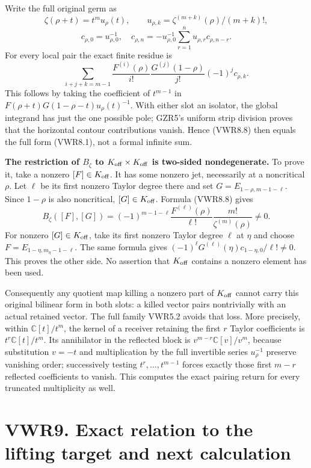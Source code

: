 Write the full original germ as \[
\zeta(\rho+t)=t^mu_\rho(t),\qquad
u_{\rho,k}=\zeta^{(m+k)}(\rho)/(m+k)!,
\] \[
c_{\rho,0}=u_{\rho,0}^{-1},\quad
c_{\rho,n}=-u_{\rho,0}^{-1}\sum_{r=1}^nu_{\rho,r}c_{\rho,n-r}.
\tag{VWR8.7}
\] For every local pair the exact finite residue is \[
\sum_{i+j+k=m-1}\frac{F^{(i)}(\rho)}{i!}
 \frac{G^{(j)}(1-\rho)}{j!}(-1)^jc_{\rho,k}.
\tag{VWR8.8}
\] This follows by taking the coefficient of \(t^{m-1}\) in
\(F(\rho+t)G(1-\rho-t)u_\rho(t)^{-1}\). With either slot an isolator,
the global integrand has just the one possible pole; GZR5's uniform
strip division proves that the horizontal contour contributions vanish.
Hence (VWR8.8) then equals the full form (VWR8.1), not a formal infinite
sum.

\textbf{The restriction of \(B_\zeta\) to
\(K_{\rm off}\times K_{\rm off}\) is two-sided nondegenerate.} To prove
it, take a nonzero \([F]\in K_{\rm off}\). It has some nonzero jet,
necessarily at a noncritical \(\rho\). Let \(\ell\) be its first nonzero
Taylor degree there and set \(G=E_{1-\rho,m-1-\ell}\). Since \(1-\rho\)
is also noncritical, \([G]\in K_{\rm off}\). Formula (VWR8.8) gives \[
B_\zeta([F],[G])=(-1)^{m-1-\ell}
\frac{F^{(\ell)}(\rho)}{\ell!}\frac{m!}{\zeta^{(m)}(\rho)}\ne0.
\tag{VWR8.9}
\] For nonzero \([G]\in K_{\rm off}\), take its first nonzero Taylor
degree \(\ell\) at \(\eta\) and choose \(F=E_{1-\eta,m_\eta-1-\ell}\).
The same formula gives
\((-1)^\ell G^{(\ell)}(\eta)c_{1-\eta,0}/\ell!\ne0\). This proves the
other side. No assertion that \(K_{\rm off}\) contains a nonzero element
has been used.

Consequently any quotient map killing a nonzero part of \(K_{\rm off}\)
cannot carry this original bilinear form in both slots: a killed vector
pairs nontrivially with an actual retained vector. The full family
VWR5.2 avoids that loss. More precisely, within \(\mathbb C[t]/t^m\),
the kernel of a receiver retaining the first \(r\) Taylor coefficients
is \(t^r\mathbb C[t]/t^m\). Its annihilator in the reflected block is
\(v^{m-r}\mathbb C[v]/v^m\), because substitution \(v=-t\) and
multiplication by the full invertible series \(u_\rho^{-1}\) preserve
vanishing order; successively testing \(t^r,\ldots,t^{m-1}\) forces
exactly those first \(m-r\) reflected coefficients to vanish. This
computes the exact pairing return for every truncated multiplicity as
well.

\section{VWR9. Exact relation to the lifting target and next
calculation}\label{vwr9.-exact-relation-to-the-lifting-target-and-next-calculation}

